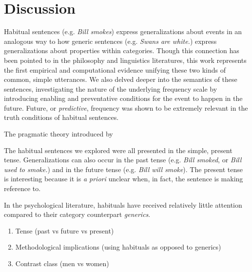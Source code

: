 \documentclass[10pt,letterpaper]{article}
\newcommand{\red}[1]{\textcolor{Red}{#1}}
\begin{document}
\section{Discussion}


Habitual sentences (e.g. \emph{Bill smokes}) express generalizations about events in an analogous way to how generic sentences (e.g. \emph{Swans are white.}) express generalizations about properties within categories. 
Though this connection has been pointed to in the philosophy and linguistics literatures, this work represents the first empirical and computational evidence unifying these two kinds of common, simple utterances. 
We also delved deeper into the semantics of these sentences, investigating the nature of the underlying frequency scale by introducing enabling and preventative conditions for the event to happen in the future. 
Future, or \emph{predictive}, frequency was shown to be extremely relevant in the truth conditions of habitual sentences. 

The pragmatic theory introduced by  

The habitual sentences we explored were all presented in the simple, present tense.
Generalizations can also occur in the past tense (e.g. \emph{Bill smoked}, or \emph{Bill used to smoke.}) and in the future tense (e.g. \emph{Bill will smoke}). 
The present tense is interesting because it is \emph{a priori} unclear when, in fact, the sentence is making reference to.  

In the psychological literature, habituals have received relatively little attention compared to their category counterpart \emph{generics}. 

\begin{enumerate}
\item Tense (past vs future vs present)
\item Methodological implications (using habituals as opposed to generics)
\item Contrast class (men vs women)
\end{enumerate}






\setlength{\bibleftmargin}{.125in}
\setlength{\bibindent}{-\bibleftmargin}


\end{document}
